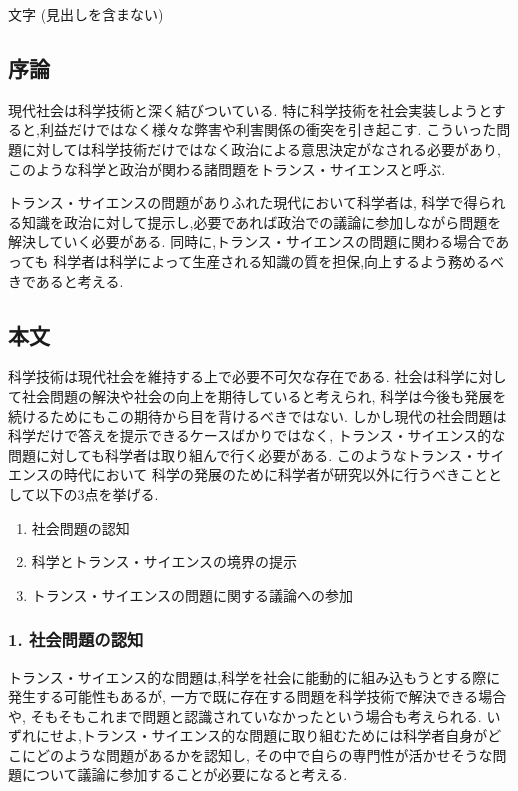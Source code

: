 \documentclass[uplatex,a4j,11pt,dvipdfmx]{jsarticle}
\begin{document}
\title{}
\author{61908697 佐々木良輔}
\date{}
\maketitle
{} 文字 (見出しを含まない)
\subsection*{序論}
現代社会は科学技術と深く結びついている.
特に科学技術を社会実装しようとすると,利益だけではなく様々な弊害や利害関係の衝突を引き起こす.
こういった問題に対しては科学技術だけではなく政治による意思決定がなされる必要があり,
このような科学と政治が関わる諸問題をトランス・サイエンスと呼ぶ.\cite{class}

トランス・サイエンスの問題がありふれた現代において科学者は,
科学で得られる知識を政治に対して提示し,必要であれば政治での議論に参加しながら問題を解決していく必要がある.
同時に,トランス・サイエンスの問題に関わる場合であっても
科学者は科学によって生産される知識の質を担保,向上するよう務めるべきであると考える.
\subsection*{本文}
科学技術は現代社会を維持する上で必要不可欠な存在である.
社会は科学に対して社会問題の解決や社会の向上を期待していると考えられ,
科学は今後も発展を続けるためにもこの期待から目を背けるべきではない.
しかし現代の社会問題は科学だけで答えを提示できるケースばかりではなく,
トランス・サイエンス的な問題に対しても科学者は取り組んで行く必要がある.
このようなトランス・サイエンスの時代において
科学の発展のために科学者が研究以外に行うべきこととして以下の3点を挙げる.
\begin{enumerate}
  \item 社会問題の認知
  \item 科学とトランス・サイエンスの境界の提示
  \item トランス・サイエンスの問題に関する議論への参加
\end{enumerate}
\subsubsection*{1. 社会問題の認知}
トランス・サイエンス的な問題は,科学を社会に能動的に組み込もうとする際に発生する可能性もあるが,
一方で既に存在する問題を科学技術で解決できる場合や,
そもそもこれまで問題と認識されていなかったという場合も考えられる.
いずれにせよ,トランス・サイエンス的な問題に取り組むためには科学者自身がどこにどのような問題があるかを認知し,
その中で自らの専門性が活かせそうな問題について議論に参加することが必要になると考える.
\end{document}
